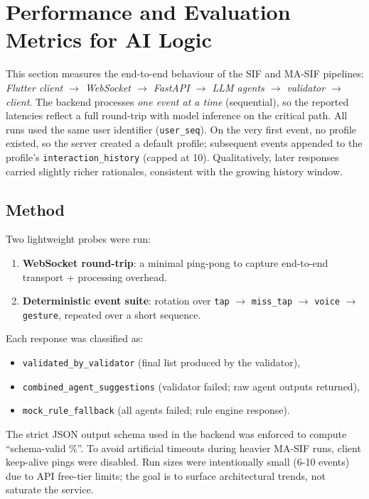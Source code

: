 \documentclass[openany]{book}
\begin{document}
\section{Performance and Evaluation Metrics for AI Logic}
\label{sec:perf-metrics-ai-logic}

This section measures the end-to-end behaviour of the SIF and MA\mbox{-}SIF pipelines:
\emph{Flutter client $\rightarrow$ WebSocket $\rightarrow$ FastAPI $\rightarrow$ LLM agents $\rightarrow$ validator $\rightarrow$ client}.
The backend processes \emph{one event at a time} (sequential), so the reported latencies reflect a full round-trip with model inference on the critical path.  
All runs used the same user identifier (\texttt{user\_seq}). On the very first event, no profile existed, so the server created a default profile; subsequent events appended to the profile’s \texttt{interaction\_history} (capped at 10). Qualitatively, later responses carried slightly richer rationales, consistent with the growing history window.

\subsection*{Method}
Two lightweight probes were run:
\begin{enumerate}
    \item \textbf{WebSocket round-trip}: a minimal ping-pong to capture end-to-end transport + processing overhead.
    \item \textbf{Deterministic event suite}: rotation over \texttt{tap} $\rightarrow$ \texttt{miss\_tap} $\rightarrow$ \texttt{voice} $\rightarrow$ \texttt{gesture}, repeated over a short sequence.
\end{enumerate}
Each response was classified as:
\begin{itemize}
    \item \texttt{validated\_by\_validator} (final list produced by the validator),
    \item \texttt{combined\_agent\_suggestions} (validator failed; raw agent outputs returned),
    \item \texttt{mock\_rule\_fallback} (all agents failed; rule engine response).
\end{itemize}
The strict JSON output schema used in the backend was enforced to compute “schema-valid \%”. To avoid artificial timeouts during heavier MA-SIF runs, client keep-alive pings were disabled. Run sizes were intentionally small (6-10 events) due to API free-tier limits; the goal is to surface architectural trends, not saturate the service.
\end{document}
